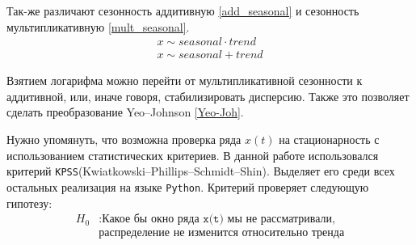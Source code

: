 \documentclass[14pt, a4paper]{extarticle}
\begin{document}
	Так-же различают сезонность аддитивную \ref{add_seasonal} и сезонность мультипликативную \ref{mult_seasonal}.
	\begin{gather}
		x \sim seasonal \cdot trend \label{add_seasonal}\\
		x \sim seasonal + trend \label{mult_seasonal}
	\end{gather}
	
	Взятием логарифма можно перейти от мультипликативной сезонности к аддитивной, или, иначе говоря, стабилизировать дисперсию.
	Также это позволяет сделать преобразование Yeo–Johnson \ref{Yeo-Joh}.
	
	
	Нужно упомянуть, что возможна проверка ряда $x(t)$ на стационарность с использованием статистических критериев. В данной работе использовался критерий \texttt{KPSS}(Kwiatkowski–Phillips–Schmidt–Shin). Выделяет его среди всех остальных реализация на языке \texttt{Python}. Критерий проверяет следующую гипотезу:
	\begin{align} 
		H_0 & : \texttt{Какое бы окно ряда x(t) мы не рассматривали,} \nonumber \\
		& \texttt{распределение не изменится относительно тренда} \label{KPSS}
	\end{align}
\end{document}
